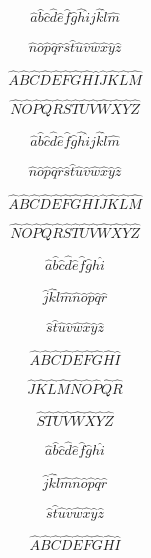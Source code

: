 
$$
\hat{a} 
\hat{b} 
\hat{c} 
\hat{d} 
\hat{e} 
\hat{f} 
\hat{g} 
\hat{h} 
\hat{i} 
\hat{j} 
\hat{k} 
\hat{l} 
\hat{m} 
$$

$$\hat{n} 
\hat{o} 
\hat{p} 
\hat{q} 
\hat{r} 
\hat{s} 
\hat{t} 
\hat{u} 
\hat{v} 
\hat{w} 
\hat{x} 
\hat{y} 
\hat{z} 
$$

$$
\hat{A} 
\hat{B} 
\hat{C} 
\hat{D} 
\hat{E} 
\hat{F} 
\hat{G} 
\hat{H} 
\hat{I} 
\hat{J} 
\hat{K} 
\hat{L} 
\hat{M} 
$$

$$
\hat{N} 
\hat{O} 
\hat{P} 
\hat{Q} 
\hat{R} 
\hat{S} 
\hat{T} 
\hat{U} 
\hat{V} 
\hat{W} 
\hat{X} 
\hat{Y} 
\hat{Z} 
$$


$$
\hat{a} 
\hat{b} 
\hat{c} 
\hat{d} 
\hat{e} 
\hat{f} 
\hat{g} 
\hat{h} 
\hat{i} 
\hat{j} 
\hat{k} 
\hat{l} 
\hat{m} 
$$

$$
\hat{n} 
\hat{o} 
\hat{p} 
\hat{q} 
\hat{r} 
\hat{s} 
\hat{t} 
\hat{u} 
\hat{v} 
\hat{w} 
\hat{x} 
\hat{y} 
\hat{z} 
$$

$$
\hat{A} 
\hat{B} 
\hat{C} 
\hat{D} 
\hat{E} 
\hat{F} 
\hat{G} 
\hat{H} 
\hat{I} 
\hat{J} 
\hat{K} 
\hat{L} 
\hat{M} 
$$

$$
\hat{N} 
\hat{O} 
\hat{P} 
\hat{Q} 
\hat{R} 
\hat{S} 
\hat{T} 
\hat{U} 
\hat{V} 
\hat{W} 
\hat{X} 
\hat{Y} 
\hat{Z} 
$$



$$
\hat{a} 
\hat{b} 
\hat{c} 
\hat{d} 
\hat{e} 
\hat{f} 
\hat{g} 
\hat{h} 
\hat{i} 
$$

$$
\hat{j} 
\hat{k} 
\hat{l} 
\hat{m} 
\hat{n} 
\hat{o} 
\hat{p} 
\hat{q} 
\hat{r} 
$$

$$
\hat{s} 
\hat{t} 
\hat{u} 
\hat{v} 
\hat{w} 
\hat{x} 
\hat{y} 
\hat{z} 
$$

$$
\hat{A} 
\hat{B} 
\hat{C} 
\hat{D} 
\hat{E} 
\hat{F} 
\hat{G} 
\hat{H} 
\hat{I} 
$$

$$
\hat{J} 
\hat{K} 
\hat{L} 
\hat{M} 
\hat{N} 
\hat{O} 
\hat{P} 
\hat{Q} 
\hat{R} 
$$

$$
\hat{S} 
\hat{T} 
\hat{U} 
\hat{V} 
\hat{W} 
\hat{X} 
\hat{Y} 
\hat{Z} 
$$


$$
\hat{a} 
\hat{b} 
\hat{c} 
\hat{d} 
\hat{e} 
\hat{f} 
\hat{g} 
\hat{h} 
\hat{i} 
$$

$$
\hat{j} 
\hat{k} 
\hat{l} 
\hat{m} 
\hat{n} 
\hat{o} 
\hat{p} 
\hat{q} 
\hat{r} 
$$

$$
\hat{s} 
\hat{t} 
\hat{u} 
\hat{v} 
\hat{w} 
\hat{x} 
\hat{y} 
\hat{z} 
$$

$$
\hat{A} 
\hat{B} 
\hat{C} 
\hat{D} 
\hat{E} 
\hat{F} 
\hat{G} 
\hat{H} 
\hat{I} 
$$

